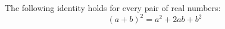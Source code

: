\documentclass{article}
\begin{document}
The following identity holds for every pair of real numbers:
\[
  (a+b)^2 = a^2 + 2ab + b^2
\]
\end{document}
